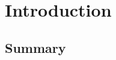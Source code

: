 \chapter{Introduction}

\blindtext
\blinditemize
\blinddescription \cite{Garcia2008}
\section{Summary}
\blindtext
